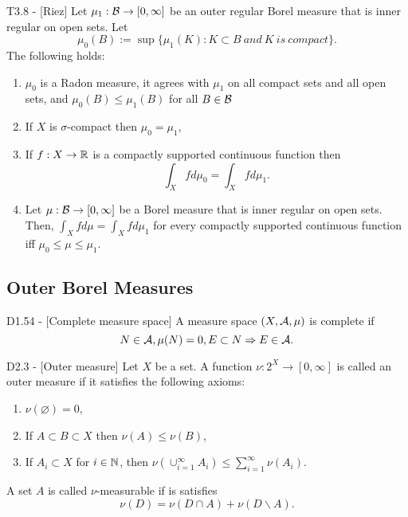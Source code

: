 \documentclass{article}
\begin{document}
\begin{flexitheorem}{T3.8 - }[Riez]
    Let $\mu_1 : \mathcal{B} \to [0, \infty]$ be an outer regular Borel measure that is inner regular on open sets. Let 
    \begin{equation}
        \mu_0(B) := \sup \{\mu_1(K) : K \subset B \ and \ K \ is \ compact \}.
    \end{equation}
    The following holds:
    \begin{enumerate}[label = (\roman*)]
        \item $\mu_0$ is a Radon measure, it agrees with $\mu_1$ on all compact sets and all open sets, and $\mu_0(B) \leq \mu_1(B)$ for all $B \in \mathcal{B}$
        \item If $X$ is $\sigma$-compact then $\mu_0 = \mu_1$,
        \item If $f: X \to \mathbb{R}$ is a compactly supported continuous function then
        \begin{equation}
            \int_X f d \mu_0 = \int_X f d \mu_1.
        \end{equation}
        \item Let $\mu : \mathcal{B} \to [0,\infty]$ be a Borel measure that is inner regular on open sets. Then, $\int_X f d\mu = \int_X f d\mu_1$ for every compactly supported continuous function iff $\mu_0 \leq \mu \leq \mu_1$.
    \end{enumerate}
\end{flexitheorem}


\subsection{Outer Borel Measures}

\begin{flexidefinition}{D1.54 - }[Complete measure space]
    A measure space $(X, \mathcal{A}, \mu)$ is complete if 
    \begin{equation}
        N \in \mathcal{A}, \mu(N) = 0, E \subset N \Rightarrow E \in \mathcal{A}.
    \end{equation}
\end{flexidefinition}

\begin{flexidefinition}{D2.3 - }[Outer measure]
    Let $X$ be a set. A function $\nu : 2^X \to [0, \infty]$ is called an outer measure if it satisfies the following axioms:
    \begin{enumerate}[label = (\alph*)]
        \item $\nu(\varnothing) = 0$,
        \item If $A \subset B \subset X$ then $\nu(A) \leq \nu(B)$,
        \item If $A_i \subset X$ for $i \in \mathbb{N}$, then $\nu\left( \cup_{i=1}^\infty A_i \right) \leq \sum_{i=1}^\infty \nu(A_i)$.
    \end{enumerate}
    A set $A$ is called $\nu$-measurable if is satisfies
    \begin{equation}
        \nu(D) = \nu(D \cap A) + \nu(D \backslash A).
    \end{equation}
\end{flexidefinition}
\end{document}
